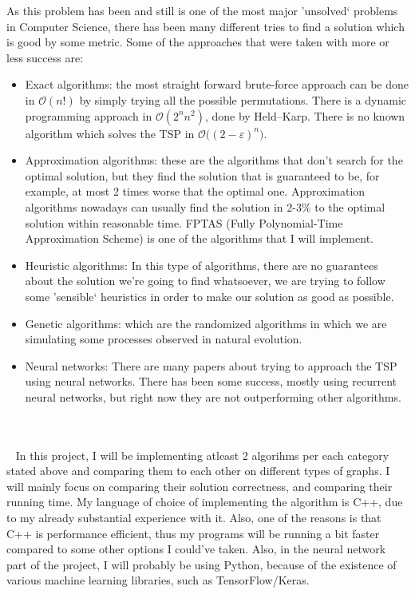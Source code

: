 As this problem has been and still is one of the most major 'unsolved` problems in Computer Science, there has been many different tries to find a solution which is good by some metric. Some of the approaches that were taken with more or less success are:
\begin{itemize}
	\item Exact algorithms: the most straight forward brute-force approach can be done in $\mathcal{O}(n!)$ by simply trying all the possible permutations. There is a dynamic programming approach in $\mathcal{O}(2^n n^2)$, done by Held--Karp. There is no known algorithm which solves the TSP in $\mathcal{O}\big((2-\varepsilon)^n\big)$.
	\item Approximation algorithms: these are the algorithms that don't search for the optimal solution, but they find the solution that is guaranteed to be, for example, at most 2 times worse that the optimal one. Approximation algorithms nowadays can usually find the solution in 2-3\% to the optimal solution within reasonable time. FPTAS (Fully Polynomial-Time Approximation Scheme) is one of the algorithms that I will implement.
	\item Heuristic algorithms: In this type of algorithms, there are no guarantees about the solution we're going to find whatsoever, we are trying to follow some 'sensible` heuristics in order to make our solution as good as possible.
    \item Genetic algorithms: which are the randomized algorithms in which we are simulating some processes observed in natural evolution.
	\item Neural networks: There are many papers about trying to approach the TSP using neural networks. There has been some success, mostly using recurrent neural networks, but right now they are not outperforming other algorithms.
\end{itemize} ~\\ ~\\~
In this project, I will be implementing atleast 2 algorihms per each category stated above and comparing them to each other on different types of graphs. I will mainly focus on comparing their solution correctness, and comparing their running time. My language of choice of implementing the algorithm is C++, due to my already substantial experience with it. Also, one of the reasons is that C++ is performance efficient, thus my programs will be running a bit faster compared to some other options I could've taken. Also, in the neural network part of the project, I will probably be using Python, because of the existence of various machine learning libraries, such as TensorFlow/Keras.


